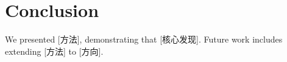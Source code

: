 \documentclass{article}
\begin{document}
\section{Conclusion}
\label{sec:conclusion}
We presented [方法], demonstrating that [核心发现].
Future work includes extending [方法] to [方向].


\end{document}

